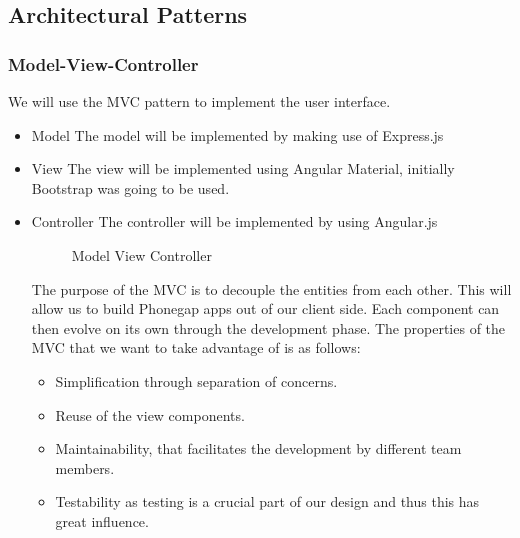\subsection{Architectural Patterns}
\subsubsection{Model-View-Controller}
We will use the MVC pattern to implement the user interface.
\begin{itemize}
	\item{Model}
	\newline
	The model will be implemented by making use of Express.js
	\item{View}
	\newline
	The view will be implemented using Angular Material, initially Bootstrap was going to be used.
	\item{Controller}
	\newline
	The controller will be implemented by using Angular.js
	\begin{figure}[H]
	    	\centering
	    	\caption{Model View Controller}
	    	\label{fig:Learning rate 0.1}
   	\end{figure}
	The purpose of the MVC is to decouple the entities from each other. This will allow us to build Phonegap apps out of our client side. Each component can then evolve on its own through the development phase. 
	The properties of the MVC that we want to take advantage of is as follows:
	\begin{itemize}
		\item Simplification through separation of concerns.
		\item Reuse of the view components.
		\item Maintainability, that facilitates the development by different team members.
		\item Testability as testing is a crucial part of our design and thus this has great influence.
	\end{itemize}
\end{itemize}

